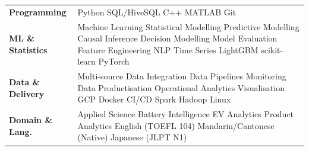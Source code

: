 \documentclass[a4paper,10pt]{article}
\begin{document}
\begin{tabular}{@{}p{3.0cm}p{12.5cm}@{}}
\textbf{Programming} & Python \textperiodcentered{} SQL/HiveSQL \textperiodcentered{} C++ \textperiodcentered{} MATLAB \textperiodcentered{} Git \\[1pt]
\textbf{ML \& Statistics} & Machine Learning \textperiodcentered{} Statistical Modelling \textperiodcentered{} Predictive Modelling \textperiodcentered{} Causal Inference \textperiodcentered{} Decision Modelling \textperiodcentered{} Model Evaluation \textperiodcentered{} Feature Engineering \textperiodcentered{} NLP \textperiodcentered{} Time Series \textperiodcentered{} LightGBM \textperiodcentered{} scikit-learn \textperiodcentered{} PyTorch \\[1pt]
\textbf{Data \& Delivery} & Multi-source Data Integration \textperiodcentered{} Data Pipelines \textperiodcentered{} Monitoring \textperiodcentered{} Data Productisation \textperiodcentered{} Operational Analytics \textperiodcentered{} Visualisation \textperiodcentered{} GCP \textperiodcentered{} Docker \textperiodcentered{} CI/CD \textperiodcentered{} Spark \textperiodcentered{} Hadoop \textperiodcentered{} Linux \\[1pt]
\textbf{Domain \& Lang.} & Applied Science \textperiodcentered{} Battery Intelligence \textperiodcentered{} EV Analytics \textperiodcentered{} Product Analytics \textperiodcentered{} English (TOEFL 104) \textperiodcentered{} Mandarin/Cantonese (Native) \textperiodcentered{} Japanese (JLPT N1) \\
\end{tabular}
\end{document}
